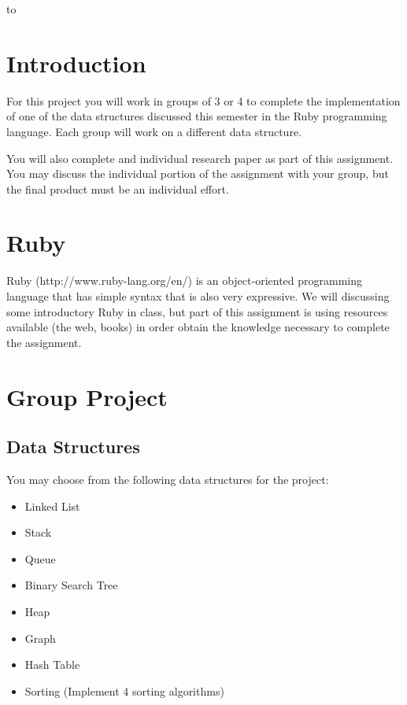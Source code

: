 \documentclass[11pt]{exam}
\begin{document}
\begin{center} 
\end{center} 

\lstset{language=Python,numbers=left}

\vspace{0.1in} 
\hbox to \textwidth{Name:\enspace\hrulefill} 

\section{Introduction}
For this project you will work in groups of 3 or 4 to complete the implementation of one of the data structures discussed this semester in the Ruby programming language.   Each group will work on a different data structure.
\par
You will also complete and individual research paper as part of this assignment.   You may discuss the individual portion of the assignment with your group, but the final product must be an individual effort.

\section{Ruby}
Ruby (http://www.ruby-lang.org/en/) is an object-oriented programming language that has simple syntax that is also very expressive.  We will discussing some introductory Ruby in class, but part of this assignment is using resources available (the web, books) in order obtain the knowledge necessary to complete the assignment.

\section{Group Project}
\subsection{Data Structures}
You may choose from the following data structures for the project:
\begin{itemize}
   \item Linked List
   \item Stack
   \item Queue
   \item Binary Search Tree
   \item Heap
   \item Graph
   \item Hash Table 
   \item Sorting (Implement 4 sorting algorithms)
\end{itemize}
\end{document}

